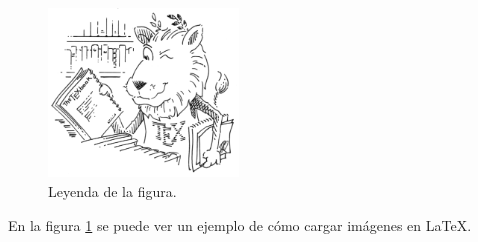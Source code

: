 \documentclass[12pt]{article}
\begin{document}
\begin{figure}[h]
	\centering
	\includegraphics[width=0.45\textwidth]{figuras/tex_lion}
	\caption{Leyenda de la figura.}
	\label{fig:texlion}
\end{figure}

En la figura \ref{fig:texlion} se puede ver un ejemplo de cómo cargar imágenes en LaTeX.
\end{document}
